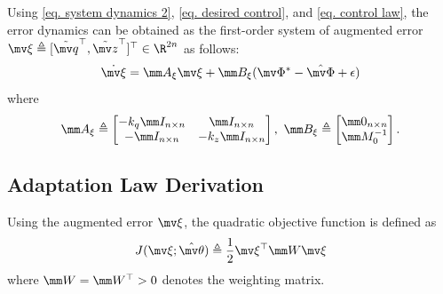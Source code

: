 \documentclass[letterpaper, 10 pt, conference]{ieeeconf}  %
\begin{document}
Using \eqref{eq. system dynamics 2}, \eqref{eq. desired control}, and \eqref{eq. control law}, the error dynamics can be obtained as the first-order system of augmented error $\mv \xi\triangleq[\tilde {\mv q}^\top ,\tilde {\mv z}^\top ]^\top \in\R^{2n}$ as follows:
\begin{equation}
    \dot{\mv \xi} 
    = 
    \mm A_\xi{\mv \xi}+\mm B_\xi(\mv \Phi^*-\hat{\mv \Phi}+\epsilon)
\end{equation}
where 
\begin{equation}
    \mm A_\xi \triangleq 
    \begin{bmatrix}
        -{k_q} \mm I_{n\times n} &\mm I_{n\times n}
        \\
        -\mm I_{n\times n}& -{k_z} \mm I_{n\times n}
    \end{bmatrix}
    ,\ 
    \mm B_\xi \triangleq 
    \begin{bmatrix}
        \mm 0_{n\times n}\\\mm M_0^{-1}
    \end{bmatrix}.
\end{equation}

\subsection{Adaptation Law Derivation}\label{sec:adap_laws}

Using the augmented error $\mv \xi$, the quadratic objective function is defined as
\begin{equation}
    J(\mv \xi;\hat{\mv \theta})\triangleq
    {1\over 2}
    \mv \xi^\top \mm W\mv \xi
\end{equation}
where $\mm W=\mm W^\top >0$ denotes the weighting matrix.
\end{document}
